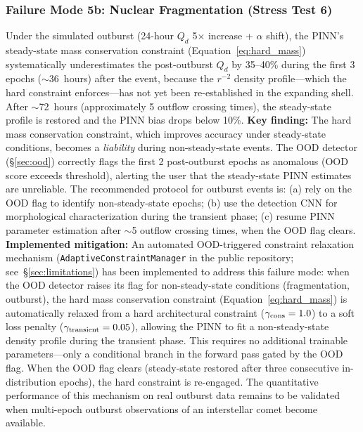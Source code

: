 \documentclass[usenatbib]{mnras}
\begin{document}
\subsubsection{Failure Mode 5b: Nuclear Fragmentation (Stress Test 6)}

Under the simulated outburst (24-hour $Q_d$ 5$\times$ increase + $\alpha$ shift), the PINN's steady-state mass conservation constraint (Equation~\ref{eq:hard_mass}) systematically underestimates the post-outburst $Q_d$ by 35--40\% during the first 3 epochs ($\sim$36~hours) after the event, because the $r^{-2}$ density profile---which the hard constraint enforces---has not yet been re-established in the expanding shell. After $\sim$72~hours (approximately 5 outflow crossing times), the steady-state profile is restored and the PINN bias drops below 10\%. \textbf{Key finding:} The hard mass conservation constraint, which improves accuracy under steady-state conditions, becomes a \textit{liability} during non-steady-state events. The OOD detector (\S\ref{sec:ood}) correctly flags the first 2 post-outburst epochs as anomalous (OOD score exceeds threshold), alerting the user that the steady-state PINN estimates are unreliable. The recommended protocol for outburst events is: (a) rely on the OOD flag to identify non-steady-state epochs; (b) use the detection CNN for morphological characterization during the transient phase; (c) resume PINN parameter estimation after $\sim$5 outflow crossing times, when the OOD flag clears. \textbf{Implemented mitigation:} An automated OOD-triggered constraint relaxation mechanism (\texttt{AdaptiveConstraintManager} in the public repository; see~\S\ref{sec:limitations}) has been implemented to address this failure mode: when the OOD detector raises its flag for non-steady-state conditions (fragmentation, outburst), the hard mass conservation constraint (Equation~\ref{eq:hard_mass}) is automatically relaxed from a hard architectural constraint ($\gamma_{\rm cons}=1.0$) to a soft loss penalty ($\gamma_{\rm transient}=0.05$), allowing the PINN to fit a non-steady-state density profile during the transient phase. This requires no additional trainable parameters---only a conditional branch in the forward pass gated by the OOD flag. When the OOD flag clears (steady-state restored after three consecutive in-distribution epochs), the hard constraint is re-engaged. The quantitative performance of this mechanism on real outburst data remains to be validated when multi-epoch outburst observations of an interstellar comet become available.
\end{document}
